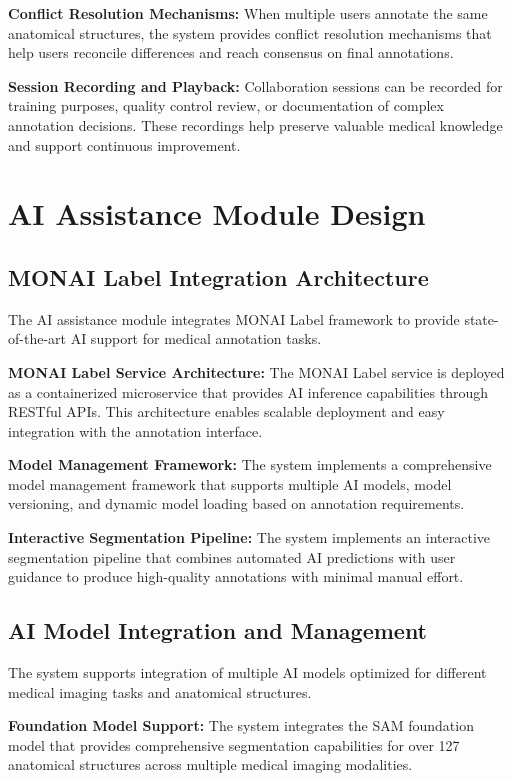 \textbf{Conflict Resolution Mechanisms:} When multiple users annotate the same anatomical structures, the system provides conflict resolution mechanisms that help users reconcile differences and reach consensus on final annotations.

\textbf{Session Recording and Playback:} Collaboration sessions can be recorded for training purposes, quality control review, or documentation of complex annotation decisions. These recordings help preserve valuable medical knowledge and support continuous improvement.

\section{AI Assistance Module Design}

\subsection{MONAI Label Integration Architecture}

The AI assistance module integrates MONAI Label framework to provide state-of-the-art AI support for medical annotation tasks.

\textbf{MONAI Label Service Architecture:} The MONAI Label service is deployed as a containerized microservice that provides AI inference capabilities through RESTful APIs. This architecture enables scalable deployment and easy integration with the annotation interface.

\textbf{Model Management Framework:} The system implements a comprehensive model management framework that supports multiple AI models, model versioning, and dynamic model loading based on annotation requirements.

\textbf{Interactive Segmentation Pipeline:} The system implements an interactive segmentation pipeline that combines automated AI predictions with user guidance to produce high-quality annotations with minimal manual effort.

\subsection{AI Model Integration and Management}

The system supports integration of multiple AI models optimized for different medical imaging tasks and anatomical structures.

\textbf{Foundation Model Support:} The system integrates the SAM foundation model that provides comprehensive segmentation capabilities for over 127 anatomical structures across multiple medical imaging modalities.

